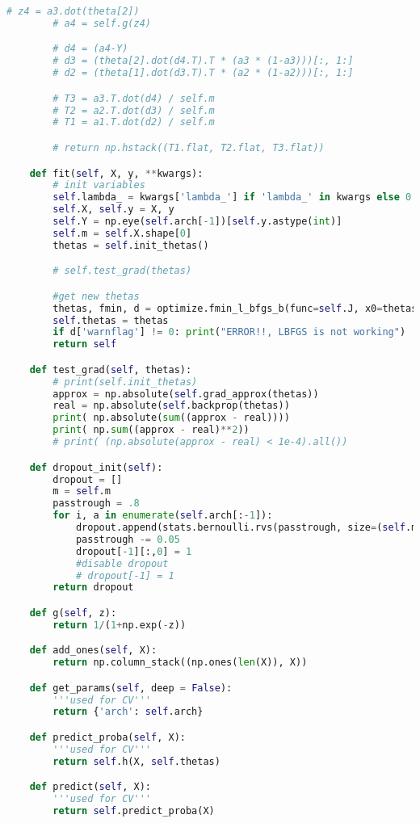 \documentclass[a4paper,11pt]{article}
\begin{document}
\begin{lstlisting}[language=Python]
        # z4 = a3.dot(theta[2])
        # a4 = self.g(z4)

        # d4 = (a4-Y)
        # d3 = (theta[2].dot(d4.T).T * (a3 * (1-a3)))[:, 1:]
        # d2 = (theta[1].dot(d3.T).T * (a2 * (1-a2)))[:, 1:]

        # T3 = a3.T.dot(d4) / self.m
        # T2 = a2.T.dot(d3) / self.m
        # T1 = a1.T.dot(d2) / self.m

        # return np.hstack((T1.flat, T2.flat, T3.flat))

    def fit(self, X, y, **kwargs):
        # init variables
        self.lambda_ = kwargs['lambda_'] if 'lambda_' in kwargs else 0
        self.X, self.y = X, y
        self.Y = np.eye(self.arch[-1])[self.y.astype(int)]
        self.m = self.X.shape[0]
        thetas = self.init_thetas()

        # self.test_grad(thetas)

        #get new thetas
        thetas, fmin, d = optimize.fmin_l_bfgs_b(func=self.J, x0=thetas, fprime=self.backprop)
        self.thetas = thetas
        if d['warnflag'] != 0: print("ERROR!!, LBFGS is not working")
        return self

    def test_grad(self, thetas):
        # print(self.init_thetas)
        approx = np.absolute(self.grad_approx(thetas))
        real = np.absolute(self.backprop(thetas))
        print( np.absolute(sum((approx - real))))
        print( np.sum((approx - real)**2))
        # print( (np.absolute(approx - real) < 1e-4).all())

    def dropout_init(self):
        dropout = []
        m = self.m
        passtrough = .8
        for i, a in enumerate(self.arch[:-1]):
            dropout.append(stats.bernoulli.rvs(passtrough, size=(self.m, a+1)))
            passtrough -= 0.05
            dropout[-1][:,0] = 1
            #disable dropout
            # dropout[-1] = 1
        return dropout

    def g(self, z):
        return 1/(1+np.exp(-z))

    def add_ones(self, X):
        return np.column_stack((np.ones(len(X)), X))

    def get_params(self, deep = False):
        '''used for CV'''
        return {'arch': self.arch}

    def predict_proba(self, X):
        '''used for CV'''
        return self.h(X, self.thetas)

    def predict(self, X):
        '''used for CV'''
        return self.predict_proba(X)

\end{lstlisting}
\end{document}
